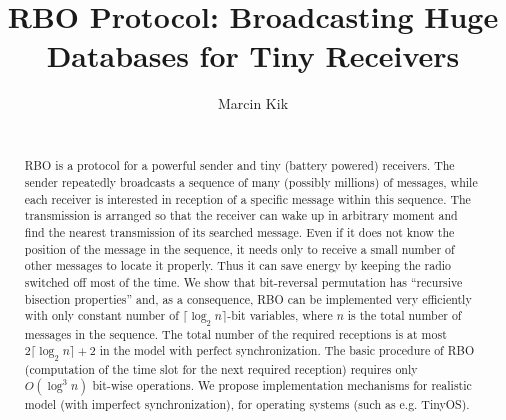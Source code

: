 \documentclass{llncs}
\title{RBO Protocol:
Broadcasting Huge Databases for Tiny Receivers%
}
\author{Marcin Kik\\
\email{ {Marcin.Kik@pwr.wroc.pl}}\\
\institute{{Institute of Mathematics and Computer Science},\\
           {Wroc\l aw University of Technology}\\
           Wybrze\.ze Wyspia\'nskiego 27, 50-370 Wroc\l aw, Poland}
}
\begin{document}
\maketitle %


\begin{abstract}
RBO is a protocol for a powerful sender and tiny (battery powered) receivers.
The sender repeatedly broadcasts a sequence of many (possibly millions) of messages,
while each receiver is interested in reception of a specific message within this
sequence.
The transmission is arranged so that the receiver can wake up in arbitrary moment and find
 the nearest transmission of its searched message.  
Even if it does not know the position of the message in the sequence,
it needs only
to receive a small number of other messages to locate it properly.
Thus it can save energy by keeping the radio switched off most of the time.
We show that bit-reversal permutation has ``recursive bisection properties''
and, as a consequence,
RBO can be implemented very efficiently 
with only constant number of $\lceil\log_2 n\rceil$-bit variables,
where $n$ is the total number of messages in the sequence. 
The total number of the required receptions is at most $2\lceil\log_2 n\rceil+2$ 
in the model with perfect synchronization.
The basic procedure of RBO 
(computation of the time slot for the next required reception)
requires only $O(\log^3 n)$ bit-wise operations.
We propose implementation mechanisms 
for realistic model (with imperfect synchronization),
for operating systems (such as e.g. TinyOS).
 
   

\end{abstract}
\end{document}
